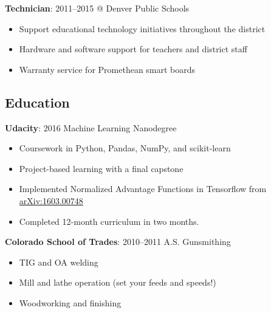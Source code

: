 \documentclass[letterpaper,12pt]{article}
\begin{document}
\begin{flushleft}
\textbf{Technician}: 2011--2015 @ Denver Public Schools
\end{flushleft}

\begin{itemize}
\item Support educational technology initiatives throughout the district
\item Hardware and software support for teachers and district staff
\item Warranty service for Promethean smart boards
\end{itemize}

\begin{center}
\subsection{Education}
\end{center}

\begin{flushleft}
\textbf{Udacity}: 2016 Machine Learning Nanodegree
\end{flushleft}

\begin{itemize}
\item Coursework in Python, Pandas, NumPy, and scikit-learn
\item Project-based learning with a final capstone
\item Implemented Normalized Advantage Functions in Tensorflow from \href{https://arxiv.org/abs/1603.00748}{arXiv:1603.00748}
\item Completed 12-month curriculum in two months.
\end{itemize}

\begin{flushleft}
\textbf{Colorado School of Trades}: 2010--2011 A.S. Gunsmithing
\end{flushleft}

\begin{itemize}
\item TIG and OA welding
\item Mill and lathe operation (set your feeds and speeds!)
\item Woodworking and finishing
\end{itemize}
\end{document}
